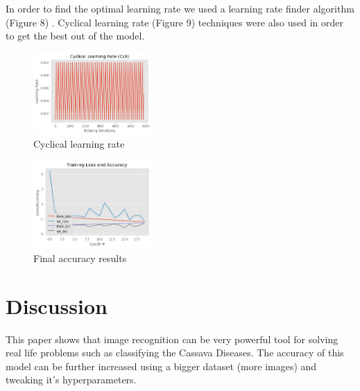 \documentclass{article}
\begin{document}
In order to find the optimal learning rate we used a learning rate finder algorithm (Figure 8) . Cyclical learning rate (Figure 9) techniques were also used in order to get the best out of the model.
\begin{figure}[!htb]
    \centering
    \includegraphics[width=0.4\textwidth]{index1.png}
    \caption{Cyclical learning rate}
    \label{CBB}
\end{figure}

\begin{figure}[!htb]
    \centering
    \includegraphics[width=0.4\textwidth]{index.png}
    \caption{Final accuracy results}
    \label{CBB}
\end{figure}

\section{Discussion}
This paper shows that image recognition can be very powerful tool for solving real life problems such as classifying the Cassava Diseases. The accuracy of this model can be further increased using a bigger dataset (more images) and tweaking it's hyperparameters.



\end{document}
